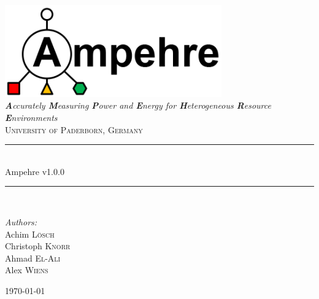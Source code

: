 %
%
%
%
%
%

\begin{titlepage}

\begin{center}

\includegraphics[width=0.7\textwidth]{figures/ampehre_logo.png}\\[1cm]

\textit{\LARGE \textbf{A}ccurately \textbf{M}easuring \textbf{P}ower and \textbf{E}nergy for \textbf{H}eterogeneous \textbf{R}esource \textbf{E}nvironments}\\[1cm]

\textsc{\Large University of Paderborn, Germany}\\[1cm]

\newcommand{\HRule}{\rule{\linewidth}{0.5mm}} \HRule \\[0.6cm] { \huge Ampehre v1.0.0}\\[0.4cm]

\HRule\\[1cm]

\begin{minipage}{0.4\textwidth} \begin{center} \large \emph{Authors:}\\ Achim \textsc{L\"osch}\\Christoph \textsc{Knorr}\\Ahmad \textsc{El-Ali}\\Alex \textsc{Wiens} \end{center} \end{minipage}

\vfill

{\Large \today}

\end{center}

\end{titlepage}

\tableofcontents
